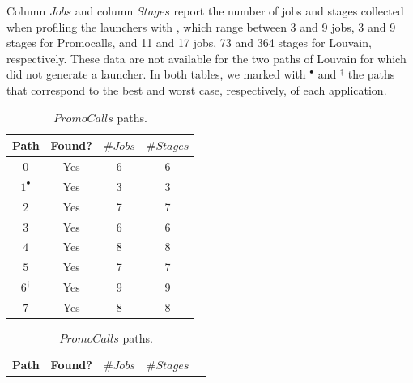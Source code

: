 Column $Jobs$ and column $Stages$ report  the number of jobs and stages collected when profiling the launchers with \cSpark, which range between 3 and 9 jobs, 3 and 9 stages for Promocalls, and 11 and 17 jobs, 73 and 364 stages for Louvain, respectively. These data are not available for the two paths of Louvain for which \dSymb did not generate a launcher.
In both tables, we marked with $^\bullet$ and $^\dagger$ the paths that correspond to the best and worst case, respectively, of each application. 

\begin{table}[thbp]
	\centering
	\hspace{1cm}
	\parbox{.48\linewidth}{
		\begin{tabular}{c|c|c|c}
			\toprule
			\multicolumn{1}{c|}{\textbf{Path}} &  \multicolumn{1}{c|}{\textbf{Found?}}   & \multicolumn{1}{c|}{\boldmath$\#Jobs$}  &  \multicolumn{1}{c}{\boldmath$\#Stages$}    \\
			\midrule
			$0$ & Yes  & 6 & 6  \\	
			$1^{\bullet}$ & Yes  &  3 &  3 \\	
			$2$ & Yes & 7  & 7 \\
			$3$ & Yes &  6 & 6 \\
			$4$ & Yes & 8  & 8  \\
			$5$ & Yes & 7 & 7 \\
			$6^{\dagger}$ & Yes & 9 & 9 \\
			$7$ & Yes &  8 & 8 \\
			\bottomrule
		\end{tabular}
		\caption{\boldmath$PromoCalls$ paths.}
		\label{Table:Check:Promo}
	}
	\centering
	\parbox{.48\linewidth}{
		\vspace{2cm}
		\hspace{0.5cm}
		\begin{tabular}{c|c|c|c|c}
			\toprule
			\multicolumn{1}{c|}{\textbf{Path}} &  \multicolumn{1}{c|}{\textbf{Found?}}   & \multicolumn{1}{c|}{\boldmath$\#Jobs$}  &  \multicolumn{1}{c}{\boldmath$\#Stages$}    \\

\end{tabular}}
\end{table}
